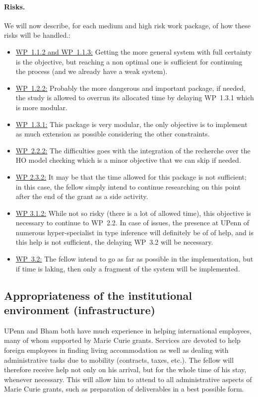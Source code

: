 \documentclass{article}[11pt]
\begin{document}
\paragraph{Risks.} We will now describe, for each medium and high risk work package, of how these risks will be handled.:
\begin{itemize}[itemindent=-2em,leftmargin=2em, labelsep=0.5em, itemsep=0em]
\item[] \underline{WP~1.1.2 and WP~1.1.3:} Getting the more general system with full certainty is the objective, but reaching a non optimal one is sufficient for continuing the process (and we already have a weak system).
\item[] \underline{WP~1.2.2:} Probably the more dangerous and important package, if needed, the study is allowed to overrun its allocated time by delaying WP~1.3.1 which is more modular.
\item[] \underline{WP~1.3.1:} This package is very modular, the only objective is to implement as much extension as possible considering the other constraints.
\item[] \underline{WP~2.2.2:} The difficulties goes with the integration of the recherche over the HO model checking which is a minor objective that we can skip if needed.
\item[] \underline{WP 2.3.2:} It may be that the time allowed for this package is not sufficient; in this case, the fellow simply intend to continue researching on this point after the end of the grant as a side activity.
\item[] \underline{WP 3.1.2:} While not so risky (there is a lot of allowed time), this objective is necessary to continue to WP~2.2. In case of issues, the presence at UPenn of numerous hyper-specialist in type inference will definitely be of of help, and is this help is not sufficient, the delaying WP~3.2 will be necessary.
\item[] \underline{WP~3.2:} The fellow intend to go as far as possible in the implementation, but if time is laking, then only a fragment of the system will be implemented.
\end{itemize}


\subsection{Appropriateness of the institutional environment (infrastructure)}
UPenn and Bham both have much experience in helping international employees, many of whom supported by Marie Curie grants. Services are devoted to help foreign employees in finding living accommodation as well as dealing with administrative tasks due to mobility (contracts, taxes, etc.).  The fellow
will therefore receive help not only on his arrival, but for the whole time of his stay, whenever necessary. This will allow him to attend to all administrative aspects of Marie Curie grants, such as preparation of deliverables in a best possible form.
\end{document}
